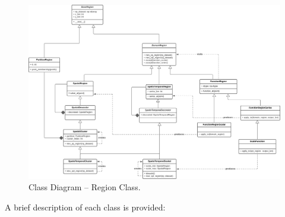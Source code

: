 \begin{figure}[tp]
	\centering
	\includegraphics[scale=0.40, angle=90]{../Figures/SPT-TSA-RegionClasses}
	\caption{Class Diagram -- Region Class.}	
	\label{Fig:DiagramClasess-Region}	 		
\end{figure}

A brief description of each class is provided:

